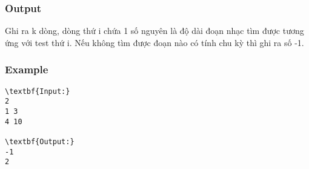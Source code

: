\subsubsection{Output}

Ghi ra k dòng, dòng thứ i chứa 1 số nguyên là độ dài đoạn nhạc tìm được tương ứng với test thứ i. Nếu không tìm được đoạn nào có tính chu kỳ thì ghi ra số -1.

\subsubsection{Example}
\begin{verbatim}
\textbf{Input:}
2
1 3
4 10

\textbf{Output:}
-1
2 
\end{verbatim}